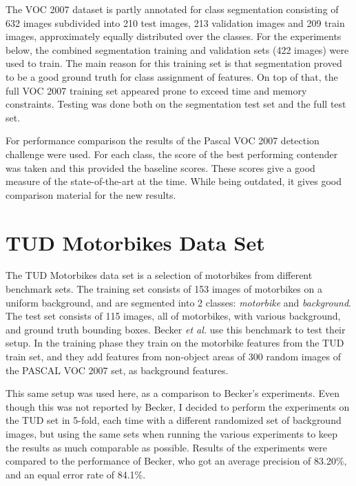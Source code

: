 The VOC 2007 dataset is partly annotated for class segmentation consisting of 632 images subdivided into 210 test images, 213 validation images and 209 train images, approximately equally distributed over the classes. For the experiments below, the combined segmentation training and validation sets (422 images) were used to train. The main reason for this training set is that segmentation proved to be a good ground truth for class assignment of features. On top of that, the full VOC 2007 training set appeared prone to exceed time and memory constraints. Testing was done both on the segmentation test set and the full test set.

For performance comparison the results of the Pascal VOC 2007 detection challenge were used. For each class, the score of the best performing contender was taken and this provided the baseline scores. These scores give a good measure of the state-of-the-art at the time. While being outdated, it gives good comparison material for the new results.


\section{TUD Motorbikes Data Set} %
\label{sec:tudmotorbikes_data_set}
The TUD Motorbikes data set is a selection of motorbikes from different benchmark sets. \cite{fritz2005integrating} The training set consists of 153 images of motorbikes on a uniform background, and are segmented into 2 classes: \emph{motorbike} and \emph{background}. The test set consists of 115 images, all of motorbikes, with various background, and ground truth bounding boxes. Becker \emph{et al.} \cite{becker2012codebook} use this benchmark to test their setup. In the training phase they train on the motorbike features from the TUD train set, and they add features from non-object areas of 300 random images of the PASCAL VOC 2007 set, as background features.

This same setup was used here, as a comparison to Becker's experiments. Even though this was not reported by Becker, I decided to perform the experiments on the TUD set in 5-fold, each time with a different randomized set of background images, but using the same sets when running the various experiments to keep the results as much comparable as possible. Results of the experiments were compared to the performance of Becker, who got an average precision of 83.20\%, and an equal error rate of 84.1\%.

